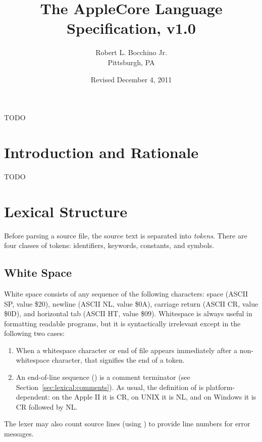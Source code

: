 \documentclass[10pt]{article}
\begin{document}
\title{\bfseries{The AppleCore Language Specification, v1.0}}
%
\author{Robert L. Bocchino Jr.\\
Pittsburgh, PA}
%
\date{Revised December 4, 2011}

\maketitle

TODO

\section{Introduction and Rationale}

TODO

\section{Lexical Structure}

Before parsing a source file, the source text is separated into
\emph{tokens}.  There are four classes of tokens: identifiers,
keywords, constants, and symbols.

\subsection{White Space}
\label{sec:lexical:white-space}

White space consists of any sequence of the following characters:
space (ASCII SP, value \$20), newline (ASCII NL, value \$0A), carriage
return (ASCII CR, value \$0D), and horizontal tab (ASCII HT, value
\$09).  Whitespace is always useful in formatting readable programs,
but it is syntactically irrelevant except in the following two cases:
%
\begin{enumerate}
%
\item {} When a whitespace character or end of
file appears immediately after a non-whitespace character, that
signifies the end of a token.
%
\item {} An end-of-line sequence () is a
  comment terminator (see Section~\ref{sec:lexical:comments}).  As
  usual, the definition of  is platform-dependent: on the
  Apple II it is CR, on UNIX it is NL, and on Windows it is CR
  followed by NL.
%
\end{enumerate}
%
The lexer may also count source lines (using ) to provide
line numbers for error messages.
\end{document}
